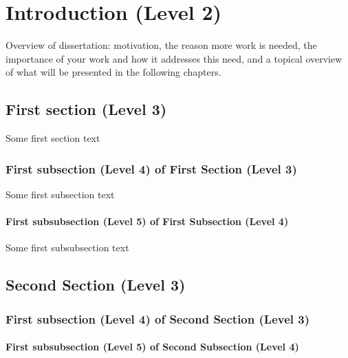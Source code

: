 \chapter[Intro]{Introduction (Level 2)}\label{chap:intro}

Overview of dissertation: motivation, the reason more work is needed, the importance of your work and how it addresses this need, and a topical overview of what will be presented in the following chapters.

\section{First section (Level 3)}

Some first section text
\subsection{First subsection (Level 4) of First Section (Level 3)}

Some first subsection text
\subsubsection{First subsubsection (Level 5) of First Subsection (Level 4)}

Some first subsubsection text
\section{Second Section (Level 3)}
\subsection{First subsection (Level 4) of Second Section (Level 3)}
\subsubsection{First subsubsection (Level 5) of Second Subsection (Level 4)}
